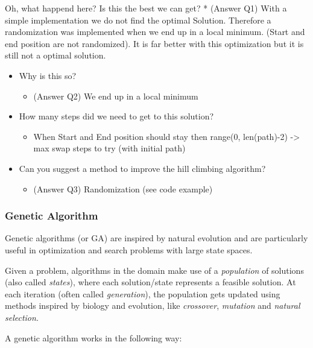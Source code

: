 \documentclass[11pt]{article}
\providecommand{\tightlist}{%
      \setlength{\itemsep}{0pt}\setlength{\parskip}{0pt}}
\begin{document}
    Oh, what happend here? Is this the best we can get? * (Answer Q1) With a
simple implementation we do not find the optimal Solution. Therefore a
randomization was implemented when we end up in a local minimum. (Start
and end position are not randomized). It is far better with this
optimization but it is still not a optimal solution.

\begin{itemize}
\tightlist
\item
  Why is this so?

  \begin{itemize}
  \tightlist
  \item
    (Answer Q2) We end up in a local minimum
  \end{itemize}
\item
  How many steps did we need to get to this solution?

  \begin{itemize}
  \tightlist
  \item
    When Start and End position should stay then range(0, len(path)-2)
    -\textgreater{} max swap steps to try (with initial path)
  \end{itemize}
\item
  Can you suggest a method to improve the hill climbing algorithm?

  \begin{itemize}
  \tightlist
  \item
    (Answer Q3) Randomization (see code example)
  \end{itemize}
\end{itemize}

    \hypertarget{genetic-algorithm}{%
\subsubsection{Genetic Algorithm}\label{genetic-algorithm}}

Genetic algorithms (or GA) are inspired by natural evolution and are
particularly useful in optimization and search problems with large state
spaces.

Given a problem, algorithms in the domain make use of a
\emph{population} of solutions (also called \emph{states}), where each
solution/state represents a feasible solution. At each iteration (often
called \emph{generation}), the population gets updated using methods
inspired by biology and evolution, like \emph{crossover},
\emph{mutation} and \emph{natural selection}.

A genetic algorithm works in the following way:
\end{document}
